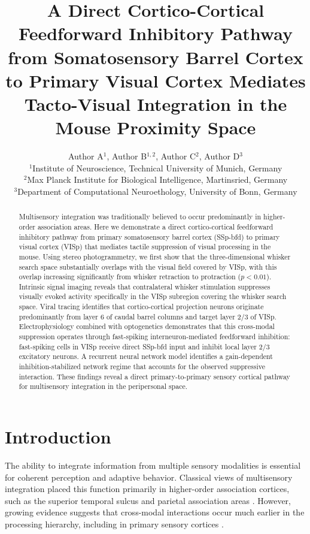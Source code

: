 \documentclass[11pt]{article}
\title{A Direct Cortico-Cortical Feedforward Inhibitory Pathway from Somatosensory Barrel Cortex to Primary Visual Cortex Mediates Tacto-Visual Integration in the Mouse Proximity Space}
\author{Author A$^{1}$, Author B$^{1,2}$, Author C$^{2}$, Author D$^{3}$ \\
\small $^{1}$Institute of Neuroscience, Technical University of Munich, Germany \\
\small $^{2}$Max Planck Institute for Biological Intelligence, Martinsried, Germany \\
\small $^{3}$Department of Computational Neuroethology, University of Bonn, Germany}
\date{}
\begin{document}
\maketitle

\begin{abstract}
Multisensory integration was traditionally believed to occur predominantly in higher-order association areas. Here we demonstrate a direct cortico-cortical feedforward inhibitory pathway from primary somatosensory barrel cortex (SSp-bfd) to primary visual cortex (VISp) that mediates tactile suppression of visual processing in the mouse. Using stereo photogrammetry, we first show that the three-dimensional whisker search space substantially overlaps with the visual field covered by VISp, with this overlap increasing significantly from whisker retraction to protraction ($p < 0.01$). Intrinsic signal imaging reveals that contralateral whisker stimulation suppresses visually evoked activity specifically in the VISp subregion covering the whisker search space. Viral tracing identifies that cortico-cortical projection neurons originate predominantly from layer 6 of caudal barrel columns and target layer 2/3 of VISp. Electrophysiology combined with optogenetics demonstrates that this cross-modal suppression operates through fast-spiking interneuron-mediated feedforward inhibition: fast-spiking cells in VISp receive direct SSp-bfd input and inhibit local layer 2/3 excitatory neurons. A recurrent neural network model identifies a gain-dependent inhibition-stabilized network regime that accounts for the observed suppressive interaction. These findings reveal a direct primary-to-primary sensory cortical pathway for multisensory integration in the peripersonal space.
\end{abstract}

\section{Introduction}

The ability to integrate information from multiple sensory modalities is essential for coherent perception and adaptive behavior. Classical views of multisensory integration placed this function primarily in higher-order association cortices, such as the superior temporal sulcus and parietal association areas \citep{stein1993merging, ghazanfar2006multisensory}. However, growing evidence suggests that cross-modal interactions occur much earlier in the processing hierarchy, including in primary sensory cortices \citep{kayser2007multisensory, iurilli2012sound}.
\end{document}
